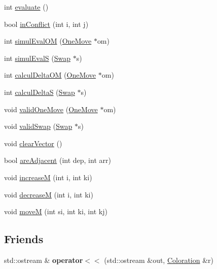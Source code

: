 \begin{DoxyCompactItemize}
int \hyperlink{classColoration_aca206c216d5d7bd46d391a7407dabc0c}{evaluate} ()
\item 
bool \hyperlink{classColoration_a0432b3075aa1856ef2ed65a3f1836a9a}{in\-Conflict} (int i, int j)
\item 
int \hyperlink{classColoration_a72244ae3ffa1f296f0245b84723d9cb1}{simul\-Eval\-O\-M} (\hyperlink{classOneMove}{One\-Move} $\ast$om)
\item 
int \hyperlink{classColoration_aad8064b03a899812cb647f36d9144be4}{simul\-Eval\-S} (\hyperlink{classSwap}{Swap} $\ast$s)
\item 
int \hyperlink{classColoration_ad96eae6de8105df79f5f14a4e7df3f44}{calcul\-Delta\-O\-M} (\hyperlink{classOneMove}{One\-Move} $\ast$om)
\item 
int \hyperlink{classColoration_a81b1294a308a39fb1561f60d0f1b5a79}{calcul\-Delta\-S} (\hyperlink{classSwap}{Swap} $\ast$s)
\item 
void \hyperlink{classColoration_a34b1962a13f56b9860efe66cf7ca4e58}{valid\-One\-Move} (\hyperlink{classOneMove}{One\-Move} $\ast$om)
\item 
void \hyperlink{classColoration_a7f66cf5cec21d5b3759a7ba48ce69f06}{valid\-Swap} (\hyperlink{classSwap}{Swap} $\ast$s)
\item 
void \hyperlink{classColoration_a3b633f79f54ca7a2cc34c693fba5743f}{clear\-Vector} ()
\item 
bool \hyperlink{classColoration_aa0a53836cc8a67fe61114ebe8e2e444a}{are\-Adjacent} (int dep, int arr)
\item 
void \hyperlink{classColoration_ac30de5a171c663a10d1243aa7d190ebf}{increase\-M} (int i, int ki)
\item 
void \hyperlink{classColoration_a90bcc068047c66ddca881bb20aa7a850}{decrease\-M} (int i, int ki)
\item 
void \hyperlink{classColoration_ab42e8be684aa412d28032e37886acdac}{move\-M} (int si, int ki, int kj)
\end{DoxyCompactItemize}
\subsection*{Friends}
\begin{DoxyCompactItemize}
\item 
\hypertarget{classColoration_a1dd18fa54c9f6f6ac8578f86d3b2123a}{std\-::ostream \& {\bfseries operator$<$$<$} (std\-::ostream \&out, \hyperlink{classColoration}{Coloration} \&r)}\label{classColoration_a1dd18fa54c9f6f6ac8578f86d3b2123a}

\end{DoxyCompactItemize}


